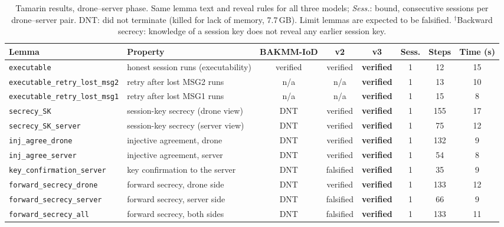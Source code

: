 \begin{table}[!t]
\centering
\footnotesize
\caption{Tamarin results, drone--server phase. Same lemma text and reveal rules for all three models; \emph{Sess.}: bound, consecutive sessions per drone--server pair. DNT: did not terminate (killed for lack of memory, 7.7\,GB). Limit lemmas are expected to be falsified. $^\dagger$Backward secrecy: knowledge of a session key does not reveal any earlier session key.}
\label{tab:tamarin}
\setlength{\tabcolsep}{3pt}
\begin{tabular}{p{3.9cm}p{4.0cm}cccccc}
\toprule
Lemma & Property & BAKMM-IoD & v2 & v3 & Sess. & Steps & Time (s) \\
\midrule
\texttt{executable} & honest session runs (executability) & verified & verified & \textbf{verified} & 1 & 12 & 15 \\
\texttt{executable\_\allowbreak{}retry\_\allowbreak{}lost\_\allowbreak{}msg2} & retry after lost MSG2 runs & n/a & n/a & \textbf{verified} & 1 & 13 & 10 \\
\texttt{executable\_\allowbreak{}retry\_\allowbreak{}lost\_\allowbreak{}msg1} & retry after lost MSG1 runs & n/a & n/a & \textbf{verified} & 1 & 15 & 8 \\
\texttt{secrecy\_\allowbreak{}SK} & session-key secrecy (drone view) & DNT & verified & \textbf{verified} & 1 & 155 & 17 \\
\texttt{secrecy\_\allowbreak{}SK\_\allowbreak{}server} & session-key secrecy (server view) & DNT & verified & \textbf{verified} & 1 & 75 & 12 \\
\texttt{inj\_\allowbreak{}agree\_\allowbreak{}drone} & injective agreement, drone & DNT & verified & \textbf{verified} & 1 & 132 & 9 \\
\texttt{inj\_\allowbreak{}agree\_\allowbreak{}server} & injective agreement, server & DNT & verified & \textbf{verified} & 1 & 54 & 8 \\
\texttt{key\_\allowbreak{}confirmation\_\allowbreak{}server} & key confirmation to the server & DNT & falsified & \textbf{verified} & 1 & 35 & 9 \\
\texttt{forward\_\allowbreak{}secrecy\_\allowbreak{}drone} & forward secrecy, drone side & DNT & verified & \textbf{verified} & 1 & 133 & 12 \\
\texttt{forward\_\allowbreak{}secrecy\_\allowbreak{}server} & forward secrecy, server side & DNT & falsified & \textbf{verified} & 1 & 66 & 9 \\
\texttt{forward\_\allowbreak{}secrecy\_\allowbreak{}all} & forward secrecy, both sides & DNT & falsified & \textbf{verified} & 1 & 133 & 11 \\

\end{tabular}
\end{table}
